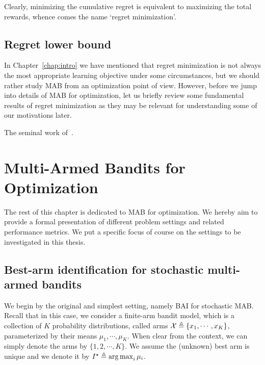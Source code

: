 Clearly, minimizing the cumulative regret is equivalent to maximizing the total rewards, whence comes the name `regret minimization'. 

\subsection{Regret lower bound}

In Chapter~\ref{chap:intro} we have mentioned that regret minimization is not always the most appropriate learning objective under some circumstances, but we should rather study MAB from an optimization point of view. However, before we jump into details of MAB for optimization, let us briefly review some fundamental results of regret minimization as they may be relevant for understanding some of our motivations later.

The seminal work of~\cite{robbins1952}.

\section{Multi-Armed Bandits for Optimization}\label{sec:mab.optim}

The rest of this chapter is dedicated to MAB for optimization. We hereby aim to provide a formal presentation of different problem settings and related performance metrics. We put a specific focus of course on the settings to be investigated in this thesis.

\subsection{Best-arm identification for stochastic multi-armed bandits}

We begin by the original and simplest setting, namely BAI for stochastic MAB. Recall that in this case, we consider a finite-arm bandit model, which is a collection of $K$ probability distributions, called arms $\mathcal{X}\triangleq\{x_1,\cdots,x_K\}$, parameterized by their means $\mu_1, \cdots, \mu_K$. When clear from the context, we can simply denote the arms by $\{1,2,\cdots,K\}$. We assume the (unknown) best arm is unique and we denote it by $I^\star \triangleq \operatorname*{arg\,max}_i \mu_i$. 

